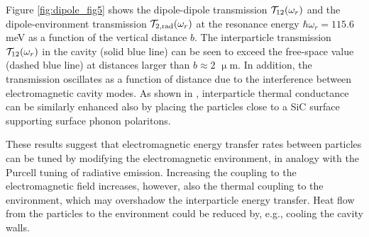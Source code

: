 Figure \ref{fig:dipole_fig5} shows the dipole-dipole transmission $\mathcal{T}_{12}(\omega_r)$ and the dipole-environment transmission $\mathcal{T}_{2,\textrm{rad}}(\omega_r)$ at the resonance energy $\hbar\omega_r=115.6$ meV as a function of the vertical distance $b$. The interparticle transmission $\mathcal{T}_{12}(\omega_r)$ in the cavity (solid blue line) can be seen to exceed the free-space value (dashed blue line) at distances larger than $b\approx 2$ $\upmu$m. In addition, the transmission oscillates as a function of distance due to the interference between electromagnetic cavity modes. As shown in , interparticle thermal conductance can be similarly enhanced also by placing the particles close to a SiC surface supporting surface phonon polaritons.

These results suggest that electromagnetic energy transfer rates between particles can be tuned by modifying the electromagnetic environment, in analogy with the Purcell tuning of radiative emission. Increasing the coupling to the electromagnetic field increases, however, also the thermal coupling to the environment, which may overshadow the interparticle energy transfer. Heat flow from the particles to the environment could be reduced by, e.g., cooling the cavity walls. 

